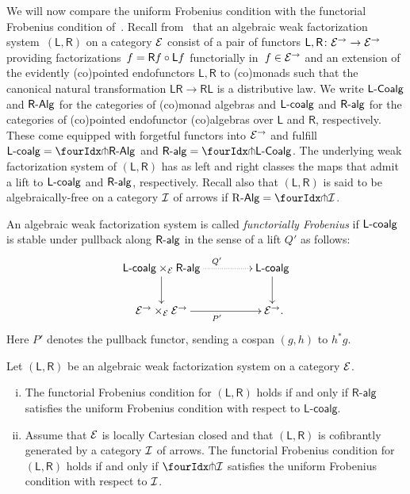 \documentclass[reqno,10pt,a4paper,oneside,draft]{amsart}
\begin{document}
{
\newcommand{\LL}{\mathsf{L}}
\newcommand{\RR}{\mathsf{R}}

We will now compare the uniform Frobenius condition with the functorial Frobenius condition of~\cite{garner:topological-simplicial}.
Recall from~\cite{bourke-garner-I} that an algebraic weak factorization system~$(\LL, \RR)$ on a category $\cal{E}$ consist of a pair of functors $\LL, \RR \co \cal{E}^\to \to \cal{E}^\to$ providing factorizations~$f = \RR f \cc \LL f$ functorially in~$f \in \cal{E}^\to$ and an extension of the evidently (co)pointed endofunctors $\LL, \RR$ to (co)monads such that the canonical natural transformation $\LL \RR \to \RR \LL$ is a distributive law.
We write $\pCoalg{\LL}$ and $\pAlg{\RR}$ for the categories of (co)monad algebras and $\pcoalg{\LL}$ and $\palg{\RR}$ for the categories of (co)pointed endofunctor (co)algebras over $\LL$ and $\RR$, respectively.
These come equipped with forgetful functors into $\cal{E}^\to$ and fulfill $\pcoalg{\LL} = \liftl{\pAlg{\RR}}$ and $\palg{\RR} = \liftr{\pCoalg{\LL}}$.
The underlying weak factorization system of $(\LL, \RR)$ has as left and right classes the maps that admit a lift to $\pcoalg{\LL}$ and $\palg{\RR}$, respectively.
Recall also that $(\LL, \RR)$ is said to be algebraically-free on a category $\cal{I}$ of arrows if $\pAlg{\R} = \liftr{\cal{I}}$.

\begin{definition} \label{functorial-frobenius}
An algebraic weak factorization system is called \emph{functorially Frobenius} if $\pcoalg{\LL}$ is stable under pullback along $\palg{\RR}$ in the sense of a lift $Q'$ as follows:
\[
\xymatrix@C+2em{
  \pcoalg{\LL} \times_{\cal{E}} \palg{\RR}
  \ar@{.>}[r]^{Q'}
  \ar[d]
&
  \pcoalg{\LL}
  \ar[d]
\\
  \cal{E}^\to \times_{\cal{E}} \cal{E}^\to
  \ar[r]_{P'}
&
  \cal{E}^\to
\rlap{.}}
\]
Here $P'$ denotes the pullback functor, sending a cospan $(g, h)$ to $h^* g$.
\end{definition}

\begin{theorem} \label{thm:frobenius-comparison}
Let $(\mathsf{L}, \mathsf{R})$ be an algebraic weak factorization system on a category $\cal{E}$.
\begin{enumerate}[(i)] 
\item
The functorial Frobenius condition for $(\LL, \RR)$ holds if and only if $\mathsf{R}$-$\mathsf{alg}$ satisfies the uniform Frobenius condition with respect to $\mathsf{L}$-$\mathsf{coalg}$.
\item
Assume that $\cal{E}$ is locally Cartesian closed and that $(\LL, \RR)$ is cofibrantly generated by a category $\cal{I}$ of arrows.
The functorial Frobenius condition for $(\LL, \RR)$ holds if and only if $\liftr{\cal{I}}$ satisfies the uniform Frobenius condition with respect to $\cal{I}$.
\end{enumerate}
\end{theorem} 

}
\end{document}
